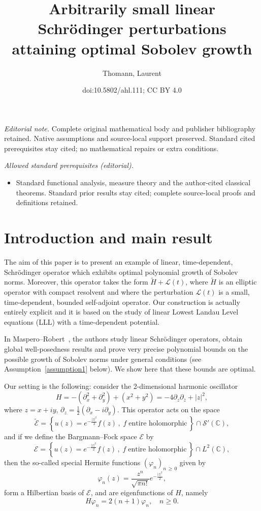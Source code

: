 \documentclass[10pt]{amsart}
\title{Arbitrarily small linear Schrödinger perturbations attaining optimal Sobolev growth}
\author{Thomann, Laurent}
\date{doi:10.5802/ahl.111; CC BY 4.0}
\theoremstyle{definition}\newtheorem{defi}[theo]{Definition}\newtheorem{rema}[theo]{Remark}\newtheorem{exam}[theo]{Example}\newtheorem{exem}[theo]{Example}\newtheorem{nota}[theo]{Notation}
\newcommand{\C}{\mathbb{C}}
\newcommand{\E}{\mathcal{E}}
\renewcommand{\L}{\mathscr{L}}
\newcommand{\crS}{\mathscr{S}}
\newcommand{\ov}{\overline}
\newcommand{\wt}{\widetilde}
\newcommand{\<}{\langle}
\renewcommand{\>}{\rangle}
\renewcommand{\phi}{\varphi}
\begin{document}
\maketitle
\noindent\textit{Editorial note.} Complete original mathematical body and publisher bibliography retained. Native assumptions and source-local support preserved. Standard cited prerequisites stay cited; no mathematical repairs or extra conditions.\par\medskip
\noindent\textit{Allowed standard prerequisites (editorial).}\begin{itemize}
\item Standard functional analysis, measure theory and the author-cited classical theorems. Standard prior results stay cited; complete source-local proofs and definitions retained.
\end{itemize}\medskip

\pagebreak

\section{Introduction and main result}


The aim of this paper is to present an example of linear, time-dependent, Schr\"odin\-ger operator which exhibits optimal polynomial growth of Sobolev norms. Moreover, this operator takes the form $\wt{H}+\L(t)$, where $\wt{H}$ is an elliptic operator with compact resolvent and where the perturbation $\L(t)$ is a small, time-dependent, bounded self-adjoint operator. Our construction is actually entirely explicit and it is based on the study of linear Lowest Landau Level equations (LLL) with a time-dependent potential.



In Maspero--Robert~\cite{MasRo}, the authors study linear Schrödinger operators, obtain global well-posedness results and prove very precise polynomial bounds on the possible growth of Sobolev norms under general conditions (see Assumption~\ref{assumption1} below). We show here that these bounds are optimal.

Our setting is the following: consider the 2-dimensional harmonic oscillator
\[
H =-\left(\partial^2_x+\partial^2_y\right)+\left(x^2+y^2\right)= -4\partial_z \partial_{\ov z}+|z|^2,
\]
where $z=x+iy$, $\partial_z=\tfrac12(\partial_x-i\partial_y)$. This operator acts on the space
\[
\wt{\E} =\left\{ u(z) = e^{-\frac{|z|^2}{2}} f(z)\,,\;f \;
\text{entire holomorphic}\,\right\}\cap \crS'(\C),
\]
and if we define the Bargmann--Fock space $\E$ by
\[
\E =\left\{ u(z) = e^{-\frac{|z|^2}{2}} f(z)\,,\;f \; \text{entire holomorphic}\,\right\}\cap L^2(\C),
\]
then the so-called special Hermite functions $(\phi_n)_{n\,\geq\,0}$ given by
\[
\varphi_n(z) = \frac{z^n}{\sqrt{\pi n!}} e^{-\frac{|z|^2}{2}},
\]
form a Hilbertian basis of $\E$, and are eigenfunctions of $H$, namely
\[
H\phi_n=2(n+1)\phi_n, \quad n\geq 0.
\]
\end{document}
